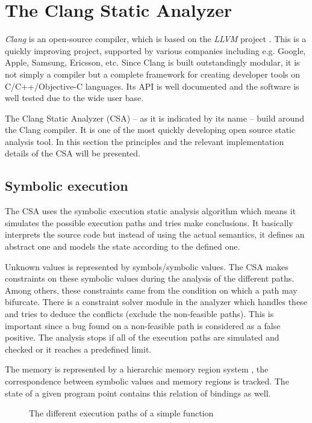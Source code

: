 \section{The Clang Static Analyzer}

\emph{Clang} is an open-source compiler, which is based on the \emph{LLVM} 
project \cite{lattner:clang}. This is a quickly improving project, 
supported by various companies including e.g. Google, Apple, Samsung, Ericsson, 
etc.
Since Clang is built outstandingly modular, it is not simply a compiler but a 
complete framework for creating developer tools on C/C++/Objective-C 
languages. Its API is well documented and the software is well tested due to 
the wide user base.


The Clang Static Analyzer (CSA) -- as it is indicated by its name -- build 
around the Clang compiler. It is one of the most quickly developing open source 
static analysis tool. In this section the principles and the relevant 
implementation details of the CSA will be presented.

\subsection{Symbolic execution}
The CSA uses the symbolic execution static analysis algorithm which means it 
simulates the possible execution paths and tries make conclusions. It basically 
interprets the source code but instead of using the actual semantics, it 
defines an abstract one and models the state according to the defined one.

Unknown values is represented by symbols/symbolic values. The CSA makes 
constraints on these symbolic values during the analysis of the different 
paths. Among others, these constraints came from the condition on which a path 
may bifurcate. There is a constraint solver module in the analyzer which 
handles these and tries to deduce the conflicts (exclude the non-feasible 
paths). This is important since a bug found on a non-feasible path is 
considered as a false positive. The analysis stops if all of the execution 
paths are simulated and checked or it reaches a predefined limit.

The memory is represented by a hierarchic memory region system 
\cite{clang:memmodel}, the correspondence between symbolic values and memory 
regions is tracked. The state of a given program point contains this relation 
of bindings as well.

\begin{figure}[h]
	\centering
	\caption{The different execution paths of a simple function}
	\label{fig:exec_path}
\end{figure}

